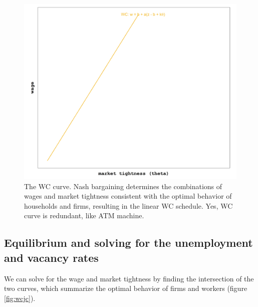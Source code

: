 \documentclass[12pt]{article}
\begin{document}
\begin{figure}
\begin{center}
\includegraphics[height = .33\textheight]{wc.png}
\end{center}
\caption{The WC curve.  Nash bargaining determines the combinations of wages and market tightness consistent with the optimal behavior of households and firms, resulting in the linear WC schedule.  Yes, WC curve is redundant, like ATM machine.}\label{fig:WC}
\end{figure}

\subsection*{Equilibrium and solving for the unemployment and vacancy rates}

We can solve for the wage and market tightness by finding the intersection of the two curves, which summarize the optimal behavior of firms and workers (figure \ref{fig:wcjc}).
\end{document}
